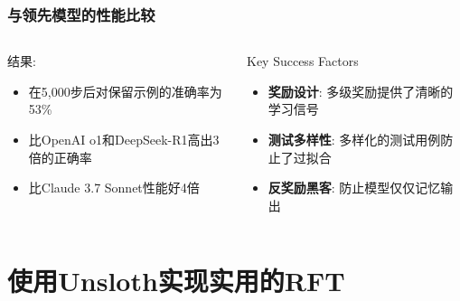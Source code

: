 \documentclass[aspectratio=169]{beamer}
\begin{document}
\begin{frame}[shrink=15]
	\frametitle{与领先模型的性能比较}
	\begin{columns}[T]
		\begin{column}{0.48\textwidth}
			\begin{block}{结果:}
				\begin{itemize}\setlength{\itemsep}{0.3em}
					\item 在5,000步后对保留示例的准确率为53\%
					\item 比OpenAI o1和DeepSeek-R1高出3倍的正确率
					\item 比Claude 3.7 Sonnet性能好4倍
				\end{itemize}
			\end{block}
		\end{column}
		\begin{column}{0.48\textwidth}
			\begin{block}{Key Success Factors}
				\begin{itemize}\setlength{\itemsep}{0.3em}
					\item \textbf{奖励设计}: 多级奖励提供了清晰的学习信号
					\item \textbf{测试多样性}: 多样化的测试用例防止了过拟合
					\item \textbf{反奖励黑客}: 防止模型仅仅记忆输出
				\end{itemize}
			\end{block}
		\end{column}
	\end{columns}
\end{frame}

\section{使用Unsloth实现实用的RFT}
\end{document}
